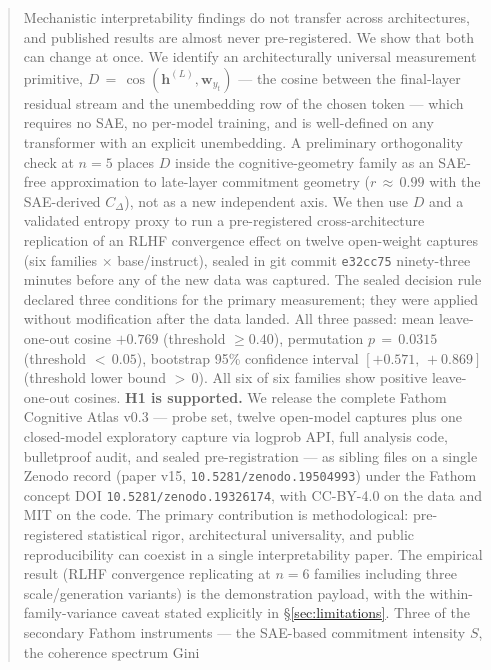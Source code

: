 \documentclass[11pt,letterpaper]{article}
\begin{document}
\begin{abstract}
Mechanistic interpretability findings do not transfer across architectures,
and published results are almost never pre-registered. We show that both
can change at once. We identify an architecturally universal measurement
primitive, $D\,=\,\cos(\mathbf{h}^{(L)},\mathbf{w}_{y_t})$ --- the cosine
between the final-layer residual stream and the unembedding row of the
chosen token --- which requires no SAE, no per-model training, and is
well-defined on any transformer with an explicit unembedding. A
preliminary orthogonality check at $n\!=\!5$ places $D$ inside the
cognitive-geometry family as an SAE-free approximation to late-layer
commitment geometry ($r\,\approx\,0.99$ with the SAE-derived $C_\Delta$),
not as a new independent axis. We then use $D$ and a validated entropy
proxy to run a pre-registered cross-architecture replication of an RLHF
convergence effect on twelve open-weight captures (six families
$\times$ base/instruct), sealed in git commit \texttt{e32cc75} ninety-three
minutes before any of the new data was captured. The sealed decision rule
declared three conditions for the primary measurement; they were applied
without modification after the data landed. All three passed: mean
leave-one-out cosine $+0.769$ (threshold $\geq 0.40$), permutation
$p\,=\,0.0315$ (threshold $<\,0.05$), bootstrap 95\% confidence interval
$[+0.571,\,+0.869]$ (threshold lower bound $>\,0$). All six of six
families show positive leave-one-out cosines. \textbf{H1 is supported.}
We release the complete Fathom Cognitive Atlas v0.3 --- probe set, twelve
open-model captures plus one closed-model exploratory capture via logprob
API, full analysis code, bulletproof audit, and sealed pre-registration
--- as sibling files on a single Zenodo record (paper v15,
\texttt{10.5281/zenodo.19504993}) under the Fathom concept DOI
\texttt{10.5281/zenodo.19326174}, with CC-BY-4.0 on the data and MIT
on the code. The primary contribution is methodological: pre-registered
statistical rigor, architectural universality, and public reproducibility
can coexist in a single interpretability paper. The empirical result
(RLHF convergence replicating at $n\!=\!6$ families including three
scale/generation variants) is the demonstration payload, with the
within-family-variance caveat stated explicitly in
\S\ref{sec:limitations}. Three of the secondary Fathom instruments ---
the SAE-based commitment intensity $S$, the coherence spectrum Gini

\end{abstract}
\end{document}
